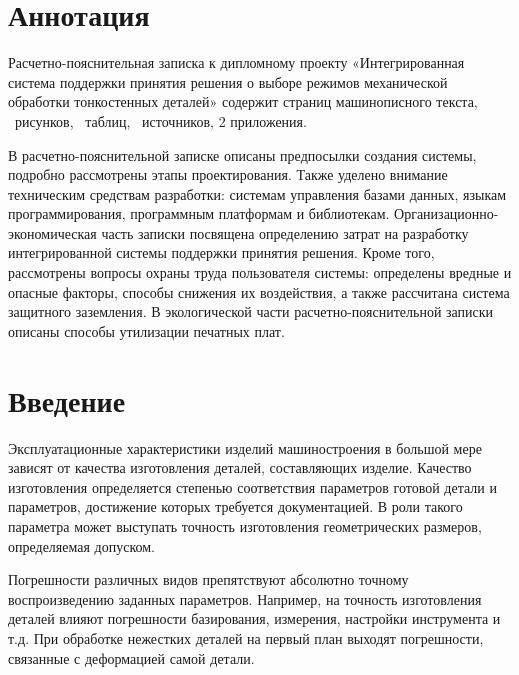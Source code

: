 \documentclass[14pt,oneside,final]{extreport}
\renewcommand{\contentsname}{Содержание}
\begin{document}
	\renewcommand*\contentsname{\hfill Содержание \hfill}
	\clearpage
	\setcounter{page}{2}
	\tableofcontents
	

	\chapter*{Аннотация}
		
	Расчетно-пояснительная записка к дипломному проекту «Интегрированная система поддержки принятия решения о выборе режимов механической обработки тонкостенных деталей» содержит \pageref{LastPage} страниц машинописного текста, \totalfigures\ рисунков, \totaltables\ таблиц,  	\ источников, 2 приложения.
		
	В расчетно-пояснительной записке описаны предпосылки создания системы, подробно рассмотрены этапы проектирования. Также уделено внимание техническим средствам разработки: системам управления базами данных, языкам программирования, программным платформам и библиотекам. Организационно-экономическая часть записки посвящена определению затрат на разработку интегрированной системы поддержки принятия решения. Кроме того, рассмотрены вопросы охраны труда пользователя системы: определены вредные и опасные факторы, способы снижения их воздействия, а также рассчитана  система защитного заземления. В экологической части расчетно-пояснительной записки описаны способы утилизации печатных плат.

	\newpage		
	
	\chapter*{Введение}
	Эксплуатационные характеристики изделий машиностроения в большой мере зависят от качества изготовления деталей, составляющих изделие. Качество изготовления определяется степенью соответствия параметров готовой детали и параметров, достижение которых требуется документацией. В роли такого параметра может выступать точность изготовления геометрических размеров, определяемая допуском. 
	
	Погрешности различных видов препятствуют абсолютно точному воспроизведению заданных параметров. Например, на точность изготовления деталей влияют погрешности базирования, измерения, настройки инструмента и т.д. При обработке нежестких деталей на первый план выходят погрешности, связанные с деформацией самой детали.
	
\end{document}
